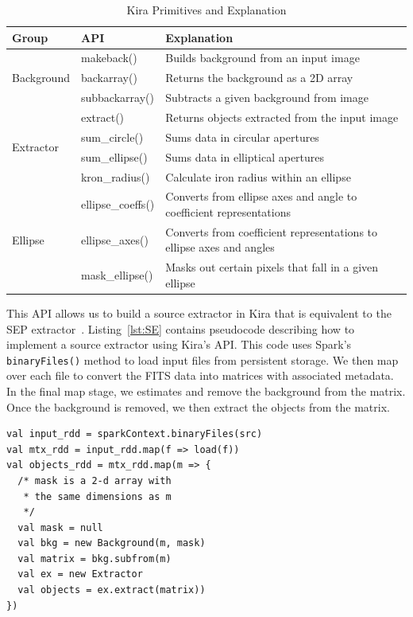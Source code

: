 \documentclass[conference]{IEEEtran}
\newcommand{\up}{\vspace*{-1em}}
\begin{document}
\begin{table}[t]
\begin{center}
\caption{Kira Primitives and Explanation}
\label{tb:Primitives}
\begin{tabular}{ |l|l|l| }
\hline
Group & API & Explanation \\ \hline \hline
\multirow{3}{*}{Background} & makeback() & Builds background from an input image \\
 & backarray() & Returns the background as a 2D array \\
 & subbackarray() & Subtracts a given background from image \\ \hline
\multirow{4}{*}{Extractor} & extract() & Returns objects extracted from the input image \\
 & sum\_circle() & Sums data in circular apertures \\
 & sum\_ellipse() & Sums data in elliptical apertures \\ 
 & kron\_radius() & Calculate iron radius within an ellipse \\ \hline
\multirow{3}{*}{Ellipse} & ellipse\_coeffs() & Converts from ellipse axes and angle to coefficient representations \\
 & ellipse\_axes() & Converts from coefficient representations to ellipse axes and angles \\ 
 & mask\_ellipse() & Masks out certain pixels that fall in a given ellipse \\ \hline
\end{tabular}
\up
\end{center}
\end{table}

This API allows us to build a source extractor in Kira that is equivalent to the SEP
extractor~\cite{barbary2015}.
Listing~\ref{lst:SE} contains pseudocode describing how to implement a source extractor
using Kira's API. This code uses Spark's \texttt{binaryFiles()} method to load input
files from persistent storage. We then map over each file to convert the FITS data into
matrices with associated metadata. In the final map stage, we estimates and remove the
background from the matrix. Once the background is removed, we then extract the objects
from the matrix.

\begin{lstlisting}[caption=Objects Extraction Logic, label=lst:SE, linewidth=0.5\textwidth, xleftmargin=2.5ex]
val input_rdd = sparkContext.binaryFiles(src)
val mtx_rdd = input_rdd.map(f => load(f))
val objects_rdd = mtx_rdd.map(m => {
  /* mask is a 2-d array with 
   * the same dimensions as m
   */
  val mask = null
  val bkg = new Background(m, mask)
  val matrix = bkg.subfrom(m)
  val ex = new Extractor
  val objects = ex.extract(matrix))
})
\end{lstlisting}
\end{document}
